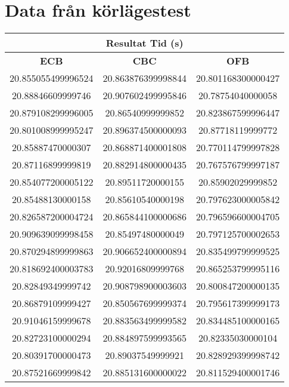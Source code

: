 \section{Data från körlägestest}
\label{app:raw-data-mode}

\begin{table}[H]
    \centering
    \begin{tabular}{ ||c|c|c|| }
      \hline
      \multicolumn{3}{|c|}{\bfseries{Resultat Tid (s)}} \\
      \hline
      \bfseries{ECB} & \bfseries{CBC} & \bfseries{OFB} \\
      \hline
      20.855055499996524 & 20.863876399998844 & 20.801168300000427 \\
      20.88846609999746 & 20.907602499995846 & 20.78754040000058 \\
      20.879108299996005 & 20.86540999999852 & 20.823867599996447 \\
      20.801008999995247 & 20.896374500000093 & 20.87718119999772 \\
      20.85887470000307 & 20.868871400001808 & 20.770114799997828 \\
      20.87116899999819 & 20.882914800000435 & 20.767576799997187 \\
      20.854077200005122 & 20.89511720000155 & 20.85902029999852 \\
      20.85488130000158 & 20.85610540000198 & 20.797623000005842 \\
      20.826587200004724 & 20.865844100000686 & 20.796596600004705 \\
      20.909639099998458 & 20.85497480000049 & 20.797125700002653 \\
      20.870294899999863 & 20.906652400000894 & 20.835499799999525 \\
      20.818692400003783 & 20.92016809999768 & 20.865253799995116 \\
      20.82849349999742 & 20.908798900003603 & 20.800847200000135 \\
      20.86879109999427 & 20.850567699999374 & 20.795617399999173 \\
      20.91046159999678 & 20.883563499999582 & 20.834485100000165 \\
      20.82723100000294 & 20.884897599993565 & 20.82335030000104 \\
      20.80391700000473 & 20.89037549999921 & 20.828929399998742 \\
      20.87521669999842 & 20.885131600000022 & 20.811529400001746 \\

\end{tabular}
\end{table}
